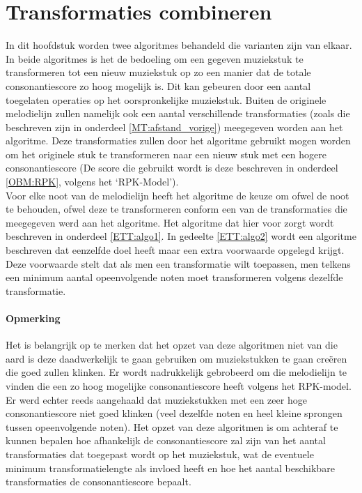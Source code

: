 \chapter{Transformaties combineren}
\label{hoofdstuk:ETT}

In dit hoofdstuk worden twee algoritmes behandeld die varianten zijn van elkaar. In beide algoritmes is het de bedoeling om een gegeven muziekstuk te transformeren tot een nieuw muziekstuk op zo een manier dat de totale consonantiescore zo hoog mogelijk is. Dit kan gebeuren door een aantal toegelaten operaties op het oorspronkelijke muziekstuk. Buiten de originele melodielijn zullen namelijk ook een aantal verschillende transformaties (zoals die beschreven zijn in onderdeel \ref{MT:afstand_vorige}) meegegeven worden aan het algoritme. Deze transformaties zullen door het algoritme gebruikt mogen worden om het originele stuk te transformeren naar een nieuw stuk met een hogere consonantiescore (De score die gebruikt wordt is deze beschreven in onderdeel \ref{OBM:RPK}, volgens het `RPK-Model').\\ 
Voor elke noot van de melodielijn heeft het algoritme de keuze om ofwel de noot te behouden, ofwel deze te transformeren conform een van de transformaties die meegegeven werd aan het algoritme. Het algoritme dat hier voor zorgt wordt beschreven in onderdeel \ref{ETT:algo1}. In gedeelte \ref{ETT:algo2} wordt een algoritme beschreven dat eenzelfde doel heeft maar een extra voorwaarde opgelegd krijgt. Deze voorwaarde stelt dat als men een transformatie wilt toepassen, men telkens een minimum aantal opeenvolgende noten moet transformeren volgens dezelfde transformatie.

\subsubsection{Opmerking}
Het is belangrijk op te merken dat het opzet van deze algoritmen niet van die aard is deze daadwerkelijk te gaan gebruiken om muziekstukken te gaan cre\"eren die goed zullen klinken. Er wordt nadrukkelijk gebrobeerd om die melodielijn te vinden die een zo hoog mogelijke consonantiescore heeft volgens het RPK-model. Er werd echter reeds aangehaald dat muziekstukken met een zeer hoge consonantiescore niet goed klinken (veel dezelfde noten en heel kleine sprongen tussen opeenvolgende noten). Het opzet van deze algoritmen is om achteraf te kunnen bepalen hoe afhankelijk de consonantiescore zal zijn van het aantal transformaties dat toegepast wordt op het muziekstuk, wat de eventuele minimum transformatielengte als invloed heeft en hoe het aantal beschikbare transformaties de consonantiescore bepaalt.


